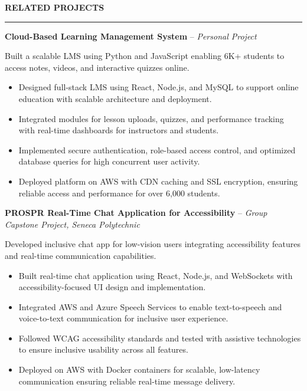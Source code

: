 \documentclass[10pt,letterpaper]{article}
\begin{document}
\vspace{6pt}

\textbf{RELATED PROJECTS}\\[-8pt]
\noindent\rule{\textwidth}{1pt}

\vspace{-2pt}

\textbf{Cloud-Based Learning Management System} -- \emph{Personal Project}

\vspace{-1pt}

Built a scalable LMS using Python and JavaScript enabling 6K+ students to access notes, videos, and interactive quizzes online.
\vspace{-1pt}
\begin{itemize}
\item Designed full-stack LMS using React, Node.js, and MySQL to support online education with scalable architecture and deployment.
\item Integrated modules for lesson uploads, quizzes, and performance tracking with real-time dashboards for instructors and students.
\item Implemented secure authentication, role-based access control, and optimized database queries for high concurrent user activity.
\item Deployed platform on AWS with CDN caching and SSL encryption, ensuring reliable access and performance for over 6,000 students.
\end{itemize}

\textbf{PROSPR  Real-Time Chat Application for Accessibility} -- \emph{Group Capstone Project, Seneca Polytechnic}

\vspace{-1pt}

Developed inclusive chat app for low-vision users integrating accessibility features and real-time communication capabilities.
\vspace{-1pt}
\begin{itemize}
\item Built real-time chat application using React, Node.js, and WebSockets with accessibility-focused UI design and implementation.
\item Integrated AWS and Azure Speech Services to enable text-to-speech and voice-to-text communication for inclusive user experience.
\item Followed WCAG accessibility standards and tested with assistive technologies to ensure inclusive usability across all features.
\item Deployed on AWS with Docker containers for scalable, low-latency communication ensuring reliable real-time message delivery.
\end{itemize}
\end{document}
